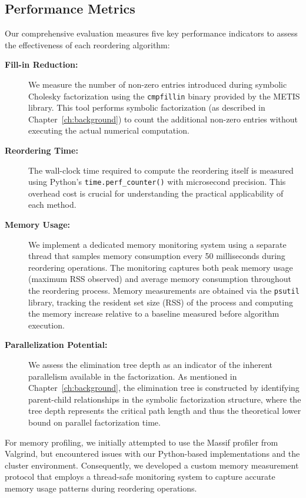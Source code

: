 \subsection{Performance Metrics}

Our comprehensive evaluation measures five key performance indicators to assess the effectiveness of each reordering algorithm:

\begin{description}
   \item[\textbf{Fill-in Reduction:}] We measure the number of non-zero entries introduced during symbolic Cholesky factorization using the \texttt{cmpfillin} binary provided by the METIS library. This tool performs symbolic factorization (as described in Chapter~\ref{ch:background}) to count the additional non-zero entries without executing the actual numerical computation. 
      
      \item[\textbf{Reordering Time:}] The wall-clock time required to compute the reordering itself is measured using Python's \texttt{time.perf\_counter()} with microsecond precision. This overhead cost is crucial for understanding the practical applicability of each method.
      
      \item[\textbf{Memory Usage:}] We implement a dedicated memory monitoring system using a separate thread that samples memory consumption every 50 milliseconds during reordering operations. The monitoring captures both peak memory usage (maximum RSS observed) and average memory consumption throughout the reordering process. Memory measurements are obtained via the \texttt{psutil} library, tracking the resident set size (RSS) of the process and computing the memory increase relative to a baseline measured before algorithm execution.

      \item[\textbf{Parallelization Potential:}] We assess the elimination tree depth as an indicator of the inherent parallelism available in the factorization. As mentioned in Chapter~\ref{ch:background}, the elimination tree is constructed by identifying parent-child relationships in the symbolic factorization structure, where the tree depth represents the critical path length and thus the theoretical lower bound on parallel factorization time.
\end{description}

For memory profiling, we initially attempted to use the Massif profiler from Valgrind, but encountered issues with our Python-based implementations and the cluster environment. Consequently, we developed a custom memory measurement protocol that employs a thread-safe monitoring system to capture accurate memory usage patterns during reordering operations.

